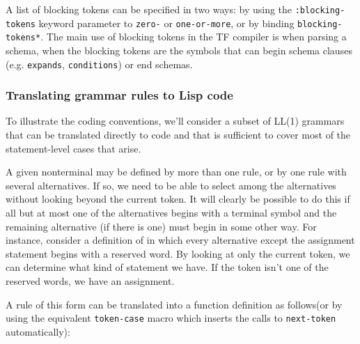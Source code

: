 A list of blocking tokens can be specified in two ways: by
using the {\tt :blocking-tokens} keyword parameter to {\tt zero-}
or {\tt one-or-more}, or by binding {\tt *blocking-tokens*}.
The main use of blocking tokens in the TF compiler is when
parsing a schema, when the blocking tokens are the symbols 
that can begin schema clauses (e.g. {\tt expands}, {\tt conditions})
or end schemas.


\subsubsection{Translating grammar rules to Lisp code}

To illustrate the coding conventions, we'll consider a subset of
LL(1) grammars that can be translated directly to code and that is
sufficient to cover most of the statement-level cases that arise.

A given nonterminal may be defined by more than one rule, or by
one rule with several alternatives.  If so, we need to be able to
select among the alternatives without looking beyond the current
token.  It will clearly be possible to do this if all but at most
one of the alternatives begins with a terminal symbol and the
remaining alternative (if there is one) must begin in some other
way.  For instance, consider a definition of  in
which every alternative except the assignment statement begins with
a reserved word.  By looking at only the current token, we can
determine what kind of statement we have.  If the token isn't one
of the reserved words, we have an assignment.

A rule of this form can be translated into a function definition as
follows\footnotemark (or by using the equivalent {\tt token-case}
macro which inserts the calls to {\tt next-token} automatically):



